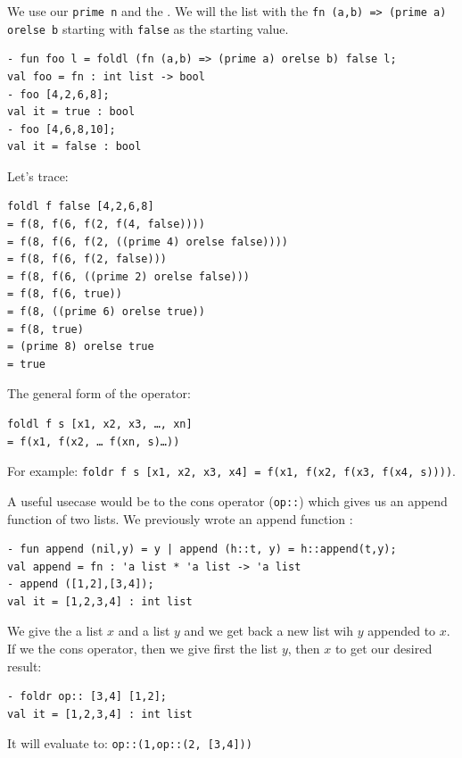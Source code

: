 We use our \texttt{prime n}  and the . We will  the list with the  \texttt{fn (a,b) => (prime a) orelse b} starting with \texttt{false} as the starting value.
\begin{verbatim}
- fun foo l = foldl (fn (a,b) => (prime a) orelse b) false l;
val foo = fn : int list -> bool
- foo [4,2,6,8];
val it = true : bool
- foo [4,6,8,10];
val it = false : bool
\end{verbatim}
Let's trace:
\begin{verbatim}
foldl f false [4,2,6,8]
= f(8, f(6, f(2, f(4, false))))
= f(8, f(6, f(2, ((prime 4) orelse false))))
= f(8, f(6, f(2, false)))
= f(8, f(6, ((prime 2) orelse false)))
= f(8, f(6, true))
= f(8, ((prime 6) orelse true))
= f(8, true)
= (prime 8) orelse true
= true
\end{verbatim}



The general form of the  operator:
\begin{verbatim}
foldl f s [x1, x2, x3, …, xn]
= f(x1, f(x2, … f(xn, s)…))
\end{verbatim}
For example: \texttt{foldr f s [x1, x2, x3, x4] = f(x1, f(x2, f(x3, f(x4, s))))}.

A useful usecase would be to  the cons operator (\texttt{op::}) which gives us an append function of two lists. We previously wrote an append function :
\begin{verbatim}
- fun append (nil,y) = y | append (h::t, y) = h::append(t,y);
val append = fn : 'a list * 'a list -> 'a list
- append ([1,2],[3,4]);
val it = [1,2,3,4] : int list
\end{verbatim}
We give the  a list $x$ and a list $y$ and we get back a new list wih $y$ appended to $x$. If we  the cons operator, then we give first the list $y$, then $x$ to get our desired result:
\begin{verbatim}
- foldr op:: [3,4] [1,2];
val it = [1,2,3,4] : int list
\end{verbatim}
It will evaluate to: \texttt{op::(1,op::(2, [3,4]))}


